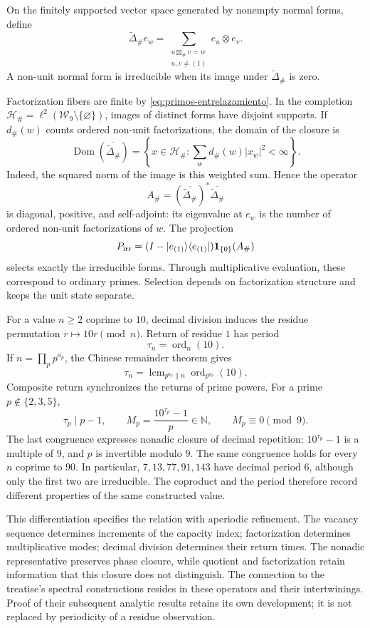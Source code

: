 \begin{definition}
On the finitely supported vector space generated by nonempty normal
forms, define
\[
 \widetilde\Delta_\# e_w
 =\sum_{\substack{u\boxtimes_\#v=w\\u,v\ne(1)}}e_u\otimes e_v.
\]
A non-unit normal form is irreducible when its image under
\(\widetilde\Delta_\#\) is zero.
\end{definition}

Factorization fibers are finite by
\eqref{eq:primos-entrelazamiento}. In the completion
\(\mathcal H_\#=\ell^2(\mathcal W_9\setminus\{\varnothing\})\),
images of distinct forms have disjoint supports. If \(d_\#(w)\)
counts ordered non-unit factorizations, the domain of the closure is
\[
 \operatorname{Dom}(\overline{\widetilde\Delta_\#})
 =\left\{x\in\mathcal H_\#:
       \sum_w d_\#(w)|x_w|^2<\infty\right\}.
\]
Indeed, the squared norm of the image is this weighted sum. Hence
the operator
\[
 A_\#=(\overline{\widetilde\Delta_\#})^*
                  \overline{\widetilde\Delta_\#}
\]
is diagonal, positive, and self-adjoint: its eigenvalue at \(e_w\)
is the number of ordered non-unit factorizations of \(w\). The projection
\[
 P_{\rm irr}=(I-|e_{(1)}\rangle\langle e_{(1)}|)
                    \mathbf1_{\{0\}}(A_\#)
\]
selects exactly the irreducible forms. Through multiplicative evaluation,
these correspond to ordinary primes. Selection depends on factorization
structure and keeps the unit state separate.

For a value \(n\geq2\) coprime to \(10\), decimal division induces
the residue permutation \(r\mapsto10r\pmod n\). Return of residue
\(1\) has period
\[
 \tau_n=\operatorname{ord}_n(10).
\]
If \(n=\prod_p p^{a_p}\), the Chinese remainder theorem gives
\[
 \tau_n=\operatorname{lcm}_{p^{a_p}\parallel n}
                    \operatorname{ord}_{p^{a_p}}(10).
\]
Composite return synchronizes the returns of prime powers.
For a prime \(p\notin\{2,3,5\}\),
\[
 \tau_p\mid p-1,\qquad
 M_p=\frac{10^{\tau_p}-1}{p}\in\mathbb N,
 \qquad M_p\equiv0\pmod9.
\]
The last congruence expresses nonadic closure of decimal repetition:
\(10^{\tau_p}-1\) is a multiple of \(9\), and \(p\) is invertible
modulo \(9\). The same congruence holds for every \(n\) coprime
to \(90\). In particular, \(7,13,77,91,143\) have decimal period
\(6\), although only the first two are irreducible. The coproduct and
the period therefore record different properties of the same constructed value.

This differentiation specifies the relation with aperiodic refinement.
The vacancy sequence determines increments of the capacity index;
factorization determines multiplicative modes; decimal division
determines their return times. The nonadic representative preserves
phase closure, while quotient and factorization retain information
that this closure does not distinguish. The connection to the treatise's
spectral constructions resides in these operators and their intertwinings.
Proof of their subsequent analytic results retains its own development;
it is not replaced by periodicity of a residue observation.

